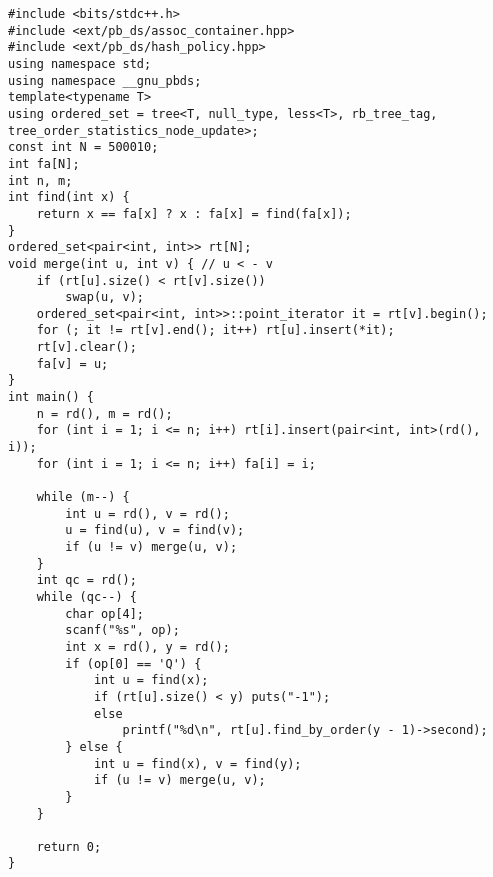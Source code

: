 \begin{verbatim}
#include <bits/stdc++.h>
#include <ext/pb_ds/assoc_container.hpp>
#include <ext/pb_ds/hash_policy.hpp>
using namespace std;
using namespace __gnu_pbds;
template<typename T>
using ordered_set = tree<T, null_type, less<T>, rb_tree_tag, tree_order_statistics_node_update>;
const int N = 500010;
int fa[N];
int n, m;
int find(int x) {
    return x == fa[x] ? x : fa[x] = find(fa[x]);
}
ordered_set<pair<int, int>> rt[N];
void merge(int u, int v) { // u < - v
    if (rt[u].size() < rt[v].size())
        swap(u, v);
    ordered_set<pair<int, int>>::point_iterator it = rt[v].begin();
    for (; it != rt[v].end(); it++) rt[u].insert(*it);
    rt[v].clear();
    fa[v] = u;
}
int main() {
    n = rd(), m = rd();
    for (int i = 1; i <= n; i++) rt[i].insert(pair<int, int>(rd(), i));
    for (int i = 1; i <= n; i++) fa[i] = i;

    while (m--) {
        int u = rd(), v = rd();
        u = find(u), v = find(v);
        if (u != v) merge(u, v);
    }
    int qc = rd();
    while (qc--) {
        char op[4];
        scanf("%s", op);
        int x = rd(), y = rd();
        if (op[0] == 'Q') {
            int u = find(x);
            if (rt[u].size() < y) puts("-1");
            else
                printf("%d\n", rt[u].find_by_order(y - 1)->second);
        } else {
            int u = find(x), v = find(y);
            if (u != v) merge(u, v);
        }
    }

    return 0;
}
\end{verbatim}